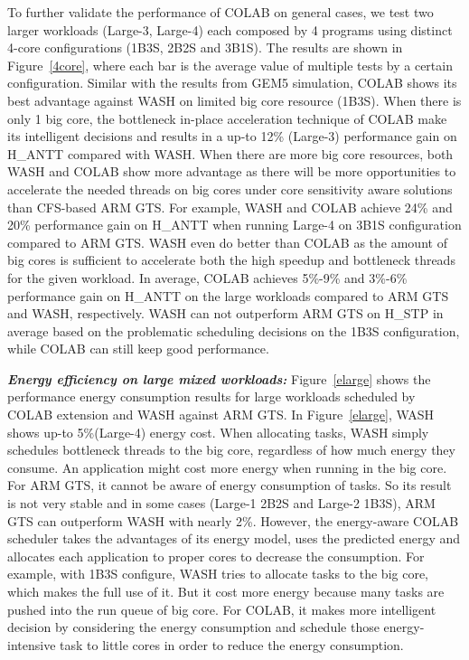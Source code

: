To further validate the performance of COLAB on general cases, we test two larger workloads (Large-3, Large-4) each composed by 4 programs using distinct 4-core configurations (1B3S, 2B2S and 3B1S). The results are shown in Figure~\ref{4core}, where each bar is the average value of multiple tests by a certain configuration. Similar with the results from GEM5 simulation, COLAB shows its best advantage against WASH on limited big core resource (1B3S). When there is only 1 big core, the bottleneck in-place acceleration technique of COLAB make its intelligent decisions and results in a up-to 12\% (Large-3) performance gain on H\_ANTT compared with WASH. When there are more big core resources, both WASH and COLAB show more advantage as there will be more opportunities to accelerate the needed threads on big cores under core sensitivity aware solutions than CFS-based ARM GTS. For example, WASH and COLAB achieve 24\% and 20\% performance gain on H\_ANTT when running Large-4 on 3B1S configuration compared to ARM GTS. WASH even do better than COLAB as the amount of big cores is sufficient to accelerate both the high speedup and bottleneck threads for the given workload. In average, COLAB achieves 5\%-9\% and 3\%-6\% performance gain on H\_ANTT on the large workloads compared to ARM GTS and WASH, respectively. WASH can not outperform ARM GTS on H\_STP in average based on the problematic scheduling decisions on the 1B3S configuration, while COLAB can still keep good performance.

\textbf{\textit{Energy efficiency on large mixed workloads:}}
Figure~\ref{elarge} shows the performance energy consumption results for large workloads scheduled by COLAB extension and WASH against ARM GTS. In Figure~\ref{elarge}, WASH shows up-to 5\%(Large-4) energy cost. When allocating tasks, WASH simply schedules bottleneck threads to the big core, regardless of how much energy they consume. An application might cost more energy when running in the big core. For ARM GTS, it cannot be aware of energy consumption of tasks. So its result is not very stable and in some cases (Large-1 2B2S and Large-2 1B3S), ARM GTS can outperform WASH with nearly 2\%. 
However, the energy-aware COLAB scheduler takes the advantages of its energy model, uses the predicted energy and allocates each application to proper cores to decrease the consumption. For example, with 1B3S configure, WASH tries to allocate tasks to the big core, which makes the full use of it. But it cost more energy because many tasks are pushed into the run queue of big core. For COLAB, it makes more intelligent decision by considering the energy consumption and schedule those energy-intensive task to little cores in order to reduce the energy consumption.

